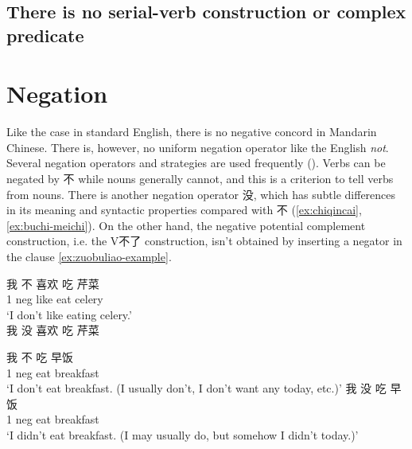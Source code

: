 \documentclass[UTF8, a4paper, oneside, scheme=plain]{ctexrep}
\newcommand{\translate}[1]{`#1'}
\begin{document}
\subsection{There is no serial-verb construction or complex predicate}\label{sec:no-serial-verb}

\section{Negation}\label{sec:negation}

Like the case in standard English, 
there is no negative concord in Mandarin Chinese.
There is, however, no uniform negation operator like the English \emph{not}. 
Several negation operators and strategies are used frequently ().
Verbs can be negated by 不 while nouns generally cannot, 
and this is a criterion to tell verbs from nouns. 
There is another negation operator 没, 
which has subtle differences in its meaning and syntactic properties compared with 不
(\ref{ex:chiqincai}, \ref{ex:buchi-meichi}).
On the other hand, the negative potential complement construction,
i.e. the V不了 construction,
isn't obtained by inserting a negator in the clause \eqref{ex:zuobuliao-example}.

\begin{exe}
    \ex \begin{xlist}
        \ex \gll 我 不 喜欢 吃 芹菜 \\
        1 \acs{neg} like eat celery \\
        \glt \translate{I don't like eating celery.} \\
        \ex * 我 没 喜欢 吃 芹菜
    \end{xlist}
    \label{ex:chiqincai}
\end{exe}

\begin{exe}
    \ex \begin{xlist}
        \ex \gll 我 不 吃 早饭 \\
        1 \acs{neg} eat breakfast \\
        \glt \translate{I don't eat breakfast. (I usually don't, I don't want any today, etc.)}
        \ex \gll 我 没 吃 早饭 \\
        1 \acs{neg} eat breakfast \\
        \glt \translate{I didn't eat breakfast. (I may usually do, but somehow I didn't today.)}
    \end{xlist}
    \label{ex:buchi-meichi}
\end{exe}
\end{document}
